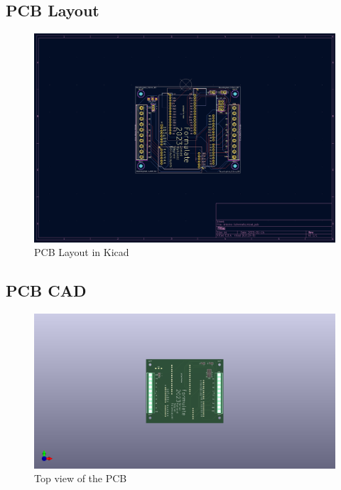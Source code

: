 \documentclass[12pt, titlepage]{article}
\begin{document}
\subsection{PCB Layout}
\begin{figure}[h!]
  \begin{center}
  \includegraphics[width=1.0\textwidth]{PCB Schematic Rev2}
  \caption{PCB Layout in Kicad}
  \end{center}
  \end{figure}
  \newpage

\subsection{PCB CAD}
\begin{figure}[h!]
  \begin{center}
  \includegraphics[width=1.0\textwidth]{PCB_Front}
  \caption{Top view of the PCB}
  \end{center}
  \end{figure}
  \newpage
\end{document}
